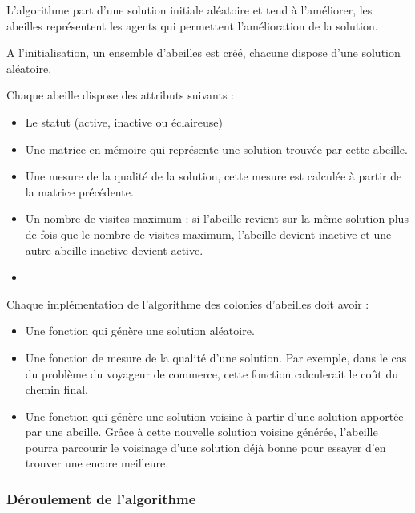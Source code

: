 \documentclass[12pt]{article}
\begin{document}
L'algorithme part d'une solution initiale aléatoire et tend à l'améliorer, les abeilles représentent les agents qui permettent l'amélioration de la solution.

A l'initialisation, un ensemble d'abeilles est créé, chacune dispose d'une solution aléatoire. 

Chaque abeille dispose des attributs suivants :
\begin{itemize}
	\item Le statut (active, inactive ou éclaireuse)
    \item Une matrice en mémoire qui représente une solution trouvée par cette abeille. 
    \item Une mesure de la qualité de la solution, cette mesure est calculée à partir de la matrice précédente. 
    \item Un nombre de visites maximum : si l'abeille revient sur la même solution plus de fois que le nombre de visites maximum, l'abeille devient inactive et une autre abeille inactive devient active. 
    \item 
\end{itemize}
Chaque implémentation de l'algorithme des colonies d'abeilles doit avoir :
\begin{itemize}
\item Une fonction qui génère une solution aléatoire. 
\item Une fonction de mesure de la qualité d'une solution. Par exemple, dans le cas du problème du voyageur de commerce, cette fonction calculerait le coût du chemin final. 
\item Une fonction qui génère une solution voisine à partir d'une solution apportée par une abeille. Grâce à cette nouvelle solution voisine générée, l'abeille pourra parcourir le voisinage d'une solution déjà bonne pour essayer d'en trouver une encore meilleure. 
\end{itemize}

\subsubsection{Déroulement de l'algorithme}
\end{document}
